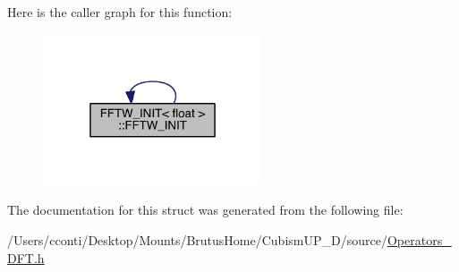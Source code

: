 Here is the caller graph for this function\+:\nopagebreak
\begin{figure}[H]
\begin{center}
\leavevmode
\includegraphics[width=184pt]{d2/de1/struct_f_f_t_w___i_n_i_t_3_01float_01_4_a95bf95941156ade33f2d8c8b7bda2e02_icgraph}
\end{center}
\end{figure}




The documentation for this struct was generated from the following file\+:\begin{DoxyCompactItemize}
\item 
/\+Users/cconti/\+Desktop/\+Mounts/\+Brutus\+Home/\+Cubism\+U\+P\+\_\+D/source/\hyperlink{_operators___d_f_t_8h}{Operators\+\_\+\+D\+F\+T.\+h}\end{DoxyCompactItemize}
